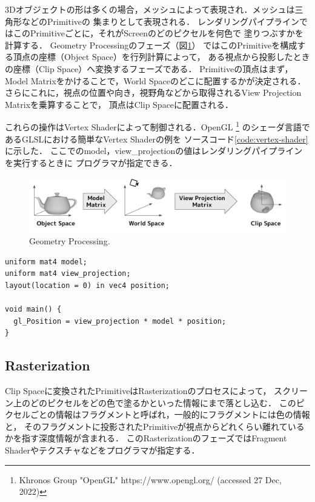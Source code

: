 3Dオブジェクトの形は多くの場合，メッシュによって表現され．メッシュは三角形などのPrimitiveの
集まりとして表現される．
レンダリングパイプラインではこのPrimitiveごとに，それがScreenのどのピクセルを何色で
塗りつぶすかを計算する．
Geometry Processingのフェーズ（図\ref{fig:geometry-processing}）
ではこのPrimitiveを構成する頂点の座標（Object Space）を行列計算によって，
ある視点から投影したときの座標（Clip Space）へ変換するフェーズである．
Primitiveの頂点はまず，Model Matrixをかけることで，World Spaceのどこに配置するかが決定される．
さらにこれに，視点の位置や向き，視野角などから取得されるView Projection Matrixを乗算することで，
頂点はClip Spaceに配置される．

これらの操作はVertex Shaderによって制御される．OpenGL
\footnote{Khronos Group "OpenGL" https://www.opengl.org/ (accessed 27 Dec, 2022)}
のシェーダ言語であるGLSLにおける簡単なVertex Shaderの例を
ソースコード\ref{code:vertex-shader}に示した．
ここでのmodel，view\_projectionの値はレンダリングパイプラインを実行するときに
プログラマが指定できる．

\begin{figure}[htbp]
  \centering
  \includegraphics[keepaspectratio, width=\linewidth]{figures/geometry-processing.png}
  \caption{
    Geometry Processing.
  }
  \label{fig:geometry-processing}
\end{figure}

\begin{lstlisting}[caption=Vertex Shaderの例, label=code:vertex-shader]
uniform mat4 model;
uniform mat4 view_projection;
layout(location = 0) in vec4 position;

void main() {
  gl_Position = view_projection * model * position;
}
\end{lstlisting}

\subsection*{Rasterization}

Clip Spaceに変換されたPrimitiveはRasterizationのプロセスによって，
スクリーン上のどのピクセルをどの色で塗るかといった情報にまで落とし込む．
このピクセルごとの情報はフラグメントと呼ばれ，一般的にフラグメントには色の情報と，
そのフラグメントに投影されたPrimitiveが視点からどれくらい離れているかを指す深度情報が含まれる．
このRasterizationのフェーズではFragment Shaderやテクスチャなどをプログラマが指定する．

